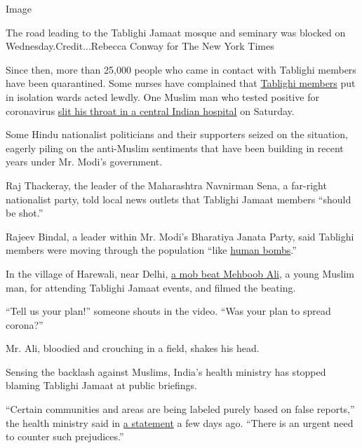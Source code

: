 Image

The road leading to the Tablighi Jamaat mosque and seminary was blocked
on Wednesday.Credit...Rebecca Conway for The New York Times

Since then, more than 25,000 people who came in contact with Tablighi
members have been quarantined. Some nurses have complained that
\href{https://www.business-standard.com/article/news-ani/six-quarantined-tablighi-jamaat-members-booked-for-misbehaviour-with-hospital-staff-in-ghaziabad-120040300114_1.html}{Tablighi
members} put in isolation wards acted lewdly. One Muslim man who tested
positive for coronavirus
\href{https://www.indiatoday.in/india/story/tablighi-jamaat-member-commits-suicide-at-maharashtra-hospital-after-testing-positive-for-covid-19-1665822-2020-04-11}{slit
his throat in a central Indian hospital} on Saturday.

Some Hindu nationalist politicians and their supporters seized on the
situation, eagerly piling on the anti-Muslim sentiments that have been
building in recent years under Mr. Modi's government.

Raj Thackeray, the leader of the Maharashtra Navnirman Sena, a far-right
nationalist party, told local news outlets that Tablighi Jamaat members
``should be shot.''

Rajeev Bindal, a leader within Mr. Modi's Bharatiya Janata Party, said
Tablighi members were moving through the population ``like
\href{https://www.deccanherald.com/national/national-politics/tablighi-members-moving-like-human-bombs-himachal-bjp-chief-821495.html}{human
bombs}.''

In the village of Harewali, near Delhi,
\href{https://newsd.in/delhi-amid-coronavirus-scare-youth-who-returned-from-jamaat-mob-lynched-in-bawana/}{a
mob beat Mehboob Ali}, a young Muslim man, for attending Tablighi Jamaat
events, and filmed the beating.

``Tell us your plan!'' someone shouts in the video. ``Was your plan to
spread corona?''

Mr. Ali, bloodied and crouching in a field, shakes his head.

Sensing the backlash against Muslims, India's health ministry has
stopped blaming Tablighi Jamaat at public briefings.

``Certain communities and areas are being labeled purely based on false
reports,'' the health ministry said in
\href{https://www.mohfw.gov.in/pdf/AddressingSocialStigmaAssociatedwithCOVID19.pdf}{a
statement} a few days ago. ``There is an urgent need to counter such
prejudices.''

